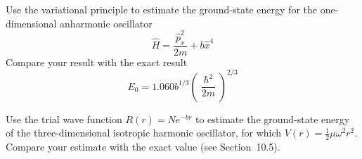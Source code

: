 \documentclass[11pt]{hmcpset}
\begin{document}

\begin{problem}

Use the variational principle to estimate the ground-state
energy for the one-dimensional anharmonic oscillator
\[
\hat{H} = {\frac{{\hat{p}_{x}^{2}} }{{2m}}} + b \hat{x}^{4}
\]
Compare your result with the exact result
\[
E_{0} = 1.060b^{1/3} \left( {{\frac{{\hslash ^{2}}}{{2m}}}} \right)^{2/3}
\]


\end{problem}
\begin{solution}
	\vfill
\end{solution}
	\pagebreak
	


\begin{problem}
	
Use the trial wave function $R(r)=Ne^{-br}$ to estimate the ground-state energy of the three-dimensional isotropic harmonic oscillator, for which $V(r)=\frac{1}{2}\mu \omega^2 r^2$. Compare your estimate with the exact value (see Section~10.5).
	
\end{problem}
\begin{solution}
	\vfill
\end{solution}
\pagebreak


\end{document}
